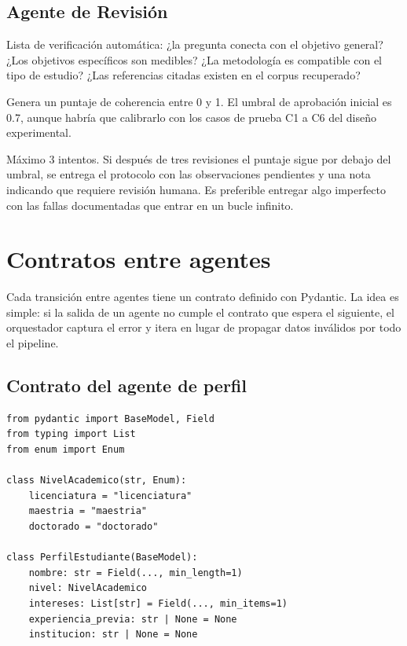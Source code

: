 \documentclass[12pt, a4paper]{article}
\begin{document}
\subsection{Agente de Revisión}

\begin{description}[style=nextline, leftmargin=3cm]
    \item[\texttt{revision/reglas-deterministas}]
    Lista de verificación automática: ¿la pregunta conecta con el
    objetivo general? ¿Los objetivos específicos son medibles? ¿La
    metodología es compatible con el tipo de estudio? ¿Las referencias
    citadas existen en el corpus recuperado?

    \item[\texttt{revision/puntaje}]
    Genera un puntaje de coherencia entre 0 y 1. El umbral de aprobación
    inicial es 0.7, aunque habría que calibrarlo con los casos de prueba
    C1 a C6 del diseño experimental.

    \item[\texttt{revision/iteracion}]
    Máximo 3 intentos. Si después de tres revisiones el puntaje sigue
    por debajo del umbral, se entrega el protocolo con las observaciones
    pendientes y una nota indicando que requiere revisión humana. Es
    preferible entregar algo imperfecto con las fallas documentadas que
    entrar en un bucle infinito.
\end{description}

\section{Contratos entre agentes}

Cada transición entre agentes tiene un contrato definido con Pydantic. La
idea es simple: si la salida de un agente no cumple el contrato que espera
el siguiente, el orquestador captura el error y itera en lugar de propagar
datos inválidos por todo el pipeline.

\subsection{Contrato del agente de perfil}

\begin{lstlisting}[style=python]
from pydantic import BaseModel, Field
from typing import List
from enum import Enum

class NivelAcademico(str, Enum):
    licenciatura = "licenciatura"
    maestria = "maestria"
    doctorado = "doctorado"

class PerfilEstudiante(BaseModel):
    nombre: str = Field(..., min_length=1)
    nivel: NivelAcademico
    intereses: List[str] = Field(..., min_items=1)
    experiencia_previa: str | None = None
    institucion: str | None = None
\end{lstlisting}
\end{document}
